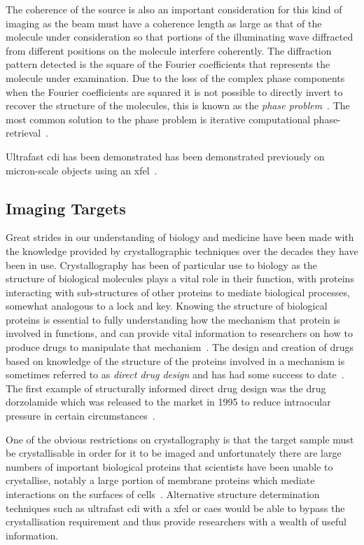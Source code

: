 The coherence of the source is also an important consideration for this kind of imaging as the beam must have a coherence length as large as that of the molecule under consideration so that portions of the illuminating wave diffracted from different positions on the molecule interfere coherently.
The diffraction pattern detected is the square of the Fourier coefficients that represents the molecule under examination.
Due to the loss of the complex phase components when the Fourier coefficients are squared it is not possible to directly invert to recover the structure of the molecules, this is known as the \emph{phase problem}~\cite{rodenburg_phase_1989}.
The most common solution to the phase problem is iterative computational phase-retrieval~\cite{chapman_coherent_2010}.

Ultrafast \gls{cdi} has been demonstrated has been demonstrated previously on micron-scale objects using an \gls{xfel}~\cite{chapman_femtosecond_2006}.

\subsection{Imaging Targets}

Great strides in our understanding of biology and medicine have been made with the knowledge provided by crystallographic techniques over the decades they have been in use.
Crystallography has been of particular use to biology as the structure of biological molecules plays a vital role in their function, with proteins interacting with sub-structures of other proteins to mediate biological processes, somewhat analogous to a lock and key.
Knowing the structure of biological proteins is essential to fully understanding how the mechanism that protein is involved in functions, and can provide vital information to researchers on how to produce drugs to manipulate that mechanism~\cite{aloy_structural_2006,almen_mapping_2009}.
The design and creation of drugs based on knowledge of the structure of the proteins involved in a mechanism is sometimes referred to as \emph{direct drug design} and has had some success to date~\cite{klebe_recent_2000,jhoti_structure-based_2007,mauser_recent_2008}.
The first example of structurally informed direct drug design was the drug dorzolamide which was released to the market in 1995 to reduce intraocular pressure in certain circumstances~\cite{greer_application_1994}.

One of the obvious restrictions on crystallography is that the target sample must be crystallisable in order for it to be imaged and unfortunately there are large numbers of important biological proteins that scientists have been unable to crystallise, notably a large portion of membrane proteins which mediate interactions on the surfaces of cells~\cite{geerlof_impact_2006}.
Alternative structure determination techniques such as ultrafast \gls{cdi} with a \gls{xfel} or \gls{caes} would be able to bypass the crystallisation requirement and thus provide researchers with a wealth of useful information.

